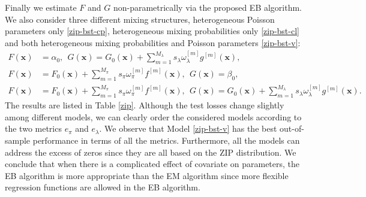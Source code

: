 \documentclass[11pt]{article}
\numberwithin{equation}{section}
\def\bx{\boldsymbol{x}}
\begin{document}
Finally we estimate $F$ and $G$ non-parametrically via the proposed EB algorithm. We also consider three different mixing structures, heterogeneous Poisson parameters only  \eqref{zip-bst-cp}, heterogeneous mixing probabilities only \eqref{zip-bst-cl} and both heterogeneous mixing probabilities and Poisson parameters \eqref{zip-bst-v}: 
\begin{align}
	F(\bx)&=\alpha_0, ~~G(\bx)=G_0(\bx)+\sum_{m=1}^{M_\lambda} s_\lambda\omega_\lambda^{[m]} g^{[m]}(\bx), \label{zip-bst-cp} \\
	F(\bx)&=F_0(\bx)+\sum_{m=1}^{M_\pi} s_\pi\omega_\pi^{[m]} f^{[m]}(\bx), ~~G(\bx)=\beta_0, \label{zip-bst-cl} \\
	F(\bx)&=F_0(\bx)+\sum_{m=1}^{M_\pi} s_\pi\omega_\pi^{[m]} f^{[m]}(\bx),  ~~G(\bx)=G_0(\bx)+\sum_{m=1}^{M_\lambda} s_\lambda\omega_\lambda^{[m]} g^{[m]}(\bx). \label{zip-bst-v}
\end{align}  
The results are listed in Table \ref{zip}.
Although the test losses change slightly among different models, we can clearly order the considered models according to the two metrics $e_\pi$ and $e_\lambda$.
We observe that Model \eqref{zip-bst-v} has the best out-of-sample performance in terms of all the metrics.
Furthermore, all the models can address the excess of zeros since they are all based on the ZIP distribution.
We conclude that when there is a complicated effect of covariate on parameters, the EB algorithm is more appropriate than the EM algorithm since more flexible regression functions are allowed in the EB algorithm.   
\end{document}
